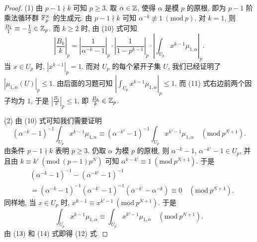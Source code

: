 \begin{proof}
(1) 由 $p-1\nmid k$ 可知 $p\geqslant 3$. 取 $\alpha\in\mathbb{Z}$, 使得 $\alpha$ 是模 $p$ 的原根, 即为 $p-1$ 阶乘法循环群 $\mathbb{F}_p^{\times}$ 的生成元. 由 $p-1\nmid k$ 可知 $\alpha^{-k}\not\equiv 1\ (\mathrm{mod}\ p)$. 对 $k=1$, 则 $\frac{B_1}{1}\equiv-\frac{1}{2}\in\mathbb{Z}_p$. 而 $k\geqslant 2$ 时, 由 (10) 式可知
\begin{equation}\tag{11}
  \left|\frac{B_k}{k}\right|_p
  =\left|\frac{1}{\alpha^{-k}-1}\right|_p\cdot
  \left|\frac{1}{1-p^{k-1}}\right|_p\cdot
  \left|\int_{U_p}x^{k-1}\mu_{1,\alpha}\right|_p.
\end{equation}
当 $x\in U_p$ 时, $\left|x^{k-1}\right|_p=1$. 而对 $U_p$ 的每个紧开子集 $U$, 我们已经证明了 $|\mu_{1,\alpha}(U)|_p\leqslant 1$. 由后面的习题可知 $\left|\int_{U_p}x^{k-1}\mu_{1,\alpha}\right|_p\leqslant 1$. 而 (11) 式右边前两个因子均为 $1$, 于是 $\left|\frac{B_k}{k}\right|_p\leqslant 1$, 即 $\frac{B_k}{k}\in\mathbb{Z}_p$.

(2) 由 (10) 式可知我们需要证明
\begin{equation}\tag{12}
  (\alpha^{-k}-1)^{-1}\int_{U_p}x^{k-1}\mu_{1,\alpha}
  \equiv(\alpha^{-k'}-1)^{-1}\int_{U_p}x^{k'-1}\mu_{1,\alpha}
  \quad(\mathrm{mod}\ p^{N+1}).
\end{equation}
由条件 $p-1\nmid k$ 表明 $p\geqslant 3$. 仍取 $\alpha$ 为模 $p$ 的原根, 则 $\alpha^{-k}-1$, $\alpha^{-k'}-1\in U_p$, 并且由 $k\equiv k'\ (\mathrm{mod}\ (p-1)p^N)$ 可知 $\alpha^{k-k'}\equiv 1\ (\mathrm{mod}\ p^{N+1})$. 于是
\begin{equation}\tag{13}
  \begin{aligned}
    &(\alpha^{-k}-1)^{-1}-(\alpha^{-k'}-1)^{-1}\\
    &=(\alpha^{-k}-1)^{-1}(\alpha^{-k'}-1)^{-1}(\alpha^{-k'}-\alpha^{-k})
    \equiv 0\quad(\mathrm{mod}\ p^{N+1}).
  \end{aligned}
\end{equation}
同样地, 当 $x\in U_p$ 时, $x^{k-1}\equiv x^{k'-1}\ (\mathrm{mod}\ p^{N+1})$. 于是
\begin{equation}\tag{14}
  \int_{U_p}x^{k-1}\mu_{1,\alpha}
  \equiv\int_{U_p}x^{k'-1}\mu_{1,\alpha}\quad(\mathrm{mod}\ p^{N+1}).
\end{equation}
由 (13) 和 (14) 式即得 (12) 式.


\end{proof}
